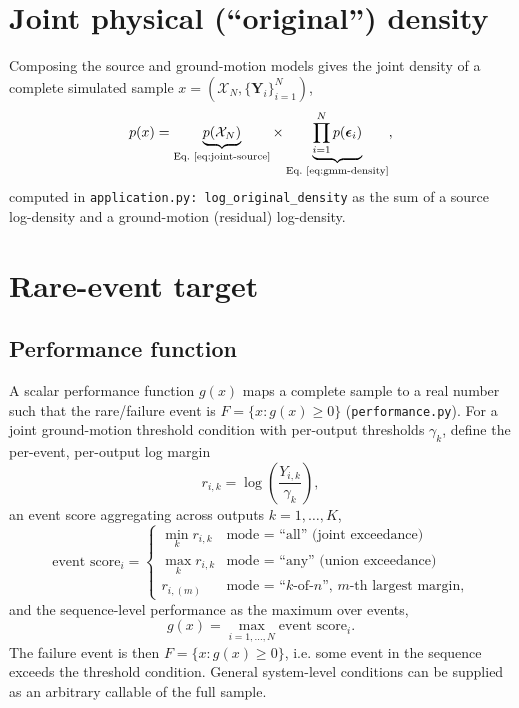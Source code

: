 \documentclass[11pt]{article}
\begin{document}
\section{Joint physical (``original'') density}

Composing the source and ground-motion models gives the joint density of a
complete simulated sample $x = (\mathcal X_N, \{\bm Y_i\}_{i=1}^N)$,
\begin{equation}
p(x) = \underbrace{p(\mathcal X_N)}_{\text{Eq.~\eqref{eq:joint-source}}}
\times
\underbrace{\prod_{i=1}^N p(\bm\epsilon_i)}_{\text{Eq.~\eqref{eq:gmm-density}}},
\label{eq:original-density}
\end{equation}
computed in \texttt{application.py: log\_original\_density} as the sum of a
source log-density and a ground-motion (residual) log-density.

\section{Rare-event target}

\subsection{Performance function}

A scalar performance function $g(x)$ maps a complete sample to a real number
such that the rare/failure event is $F = \{x : g(x) \ge 0\}$
(\texttt{performance.py}). For a joint ground-motion threshold condition with
per-output thresholds $\gamma_k$, define the per-event, per-output log
margin
\begin{equation}
r_{i,k} = \log\!\left(\frac{Y_{i,k}}{\gamma_k}\right),
\end{equation}
an event score aggregating across outputs $k=1,\dots,K$,
\begin{equation}
\text{event score}_i =
\begin{cases}
\min_k r_{i,k} & \text{mode = ``all'' (joint exceedance)}\\
\max_k r_{i,k} & \text{mode = ``any'' (union exceedance)}\\
r_{i,(m)} & \text{mode = ``$k$-of-$n$'', $m$-th largest margin,}
\end{cases}
\end{equation}
and the sequence-level performance as the maximum over events,
\begin{equation}
g(x) = \max_{i=1,\dots,N} \text{event score}_i .
\end{equation}
The failure event is then $F = \{x : g(x) \ge 0\}$, i.e. some event in the
sequence exceeds the threshold condition. General system-level conditions can
be supplied as an arbitrary callable of the full sample.
\end{document}
